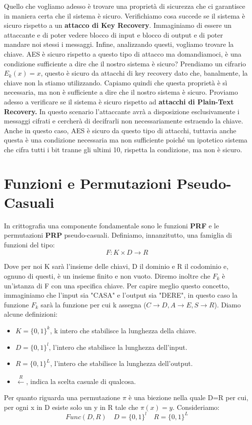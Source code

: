 Quello che vogliamo adesso è trovare una proprietà di sicurezza che ci garantisce in maniera certa che il sistema è sicuro. Verifichiamo cosa succede se il sistema è sicuro rispetto a un \textbf{attacco di Key Recovery}. Immaginiamo di essere un attaccante e di poter vedere blocco di input e blocco di output e di poter mandare noi stessi i messaggi. Infine, analizzando questi, vogliamo trovare la chiave. AES è sicuro rispetto a questo tipo di attacco ma domandiamoci, è una condizione sufficiente a dire che il nostro sistema è sicuro?
Prendiamo un cifrario $E_k(x) = x$, questo è sicuro da attacchi di key recovery dato che, banalmente, la chiave non la stiamo utilizzando. Capiamo quindi che questa proprietà è sì necessaria, ma non è sufficiente a dire che il nostro sistema è sicuro.
Proviamo adesso a verificare se il sistema è sicuro rispetto ad \textbf{attacchi di Plain-Text Recovery.} In questo scenario l'attaccante avrà a disposizione esclusivamente i messaggi cifrati e cercherà di decifrarli non necessariamente estraendo la chiave. Anche in questo caso, AES è sicuro da questo tipo di attacchi, tuttavia anche questa è una condizione necessaria ma non sufficiente poiché un ipotetico sistema che cifra tutti i bit tranne gli ultimi 10, rispetta la condizione, ma non è sicuro.

\chapter{Funzioni e Permutazioni Pseudo-Casuali}

In crittografia una componente fondamentale sono le funzioni \textbf{PRF} e le permutazioni \textbf{PRP} pseudo-casuali. Definiamo, innanzitutto, una famiglia di funzioni del tipo:
\[F:K \times D \xrightarrow{}R\]

Dove per noi K sarà l'insieme delle chiavi, D il dominio e R il codominio e, ognuno di questi, è un insieme finito e non vuoto. Diremo inoltre che $F_k$ è un'istanza di F con una specifica chiave. Per capire meglio questo concetto, immaginiamo che l'input sia "CASA" e l'output sia "DERE", in questo caso la funzione $F_k$ sarà la funzione per cui k assegna ($C\xrightarrow{}D, A\xrightarrow{}E, S\xrightarrow{}R$).
Diamo alcune definizioni:
\begin{itemize}
    \item $K=\{0,1\}^k$, k intero che stabilisce la lunghezza della chiave.
    \item $D=\{0,1\}^l$, l'intero che stabilisce la lunghezza dell'input.
    \item $R=\{0,1\}^L$, l'intero che stabilisce la lunghezza dell'output.
    \item $\xleftarrow{R}$, indica la scelta casuale di qualcosa.
\end{itemize}
Per quanto riguarda una permutazione $\pi$ è una biezione nella quale D=R per cui, per ogni x in D esiste solo un y in R tale che $\pi(x)=y$. Consideriamo:
\[Func(D,R) \quad D=\{0,1\}^l \quad R=\{0,1\}^L\]

